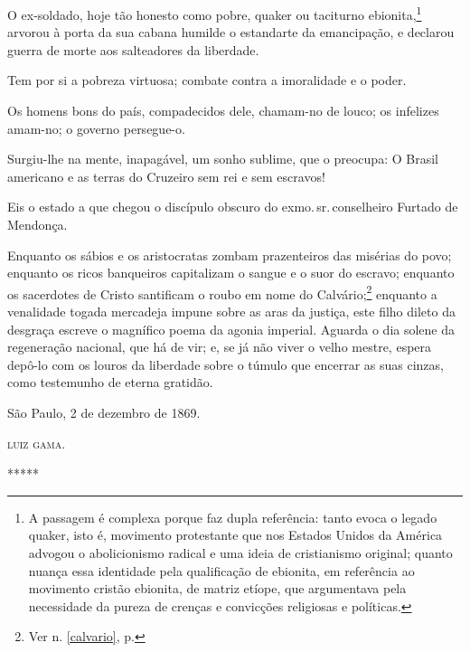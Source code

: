 O ex-soldado, hoje tão honesto como pobre, quaker ou taciturno
ebionita,\footnote{A passagem é complexa porque faz dupla referência:
  tanto evoca o legado quaker, isto é, movimento protestante que nos
  Estados Unidos da América advogou o abolicionismo radical e uma ideia
  de cristianismo original; quanto nuança essa identidade pela
  qualificação de ebionita, em referência ao movimento cristão ebionita,
  de matriz etíope, que argumentava pela necessidade da pureza de
  crenças e convicções religiosas e políticas.} arvorou à porta da sua
cabana humilde o estandarte da emancipação, e declarou guerra de morte
aos salteadores da liberdade.

Tem por si a pobreza virtuosa; combate contra a imoralidade e o poder.

Os homens bons do país, compadecidos dele, chamam-no de louco; os
infelizes amam-no; o governo persegue-o.

Surgiu-lhe na mente, inapagável, um sonho sublime, que o preocupa: O
Brasil americano e as terras do Cruzeiro sem rei e sem escravos!

Eis o estado a que chegou o discípulo obscuro do exmo.\,sr.\,conselheiro
Furtado de Mendonça.

Enquanto os sábios e os aristocratas zombam prazenteiros das misérias do
povo; enquanto os ricos banqueiros capitalizam o sangue e o suor do
escravo; enquanto os sacerdotes de Cristo santificam o roubo em nome do
Calvário;\footnote{Ver n. \ref{calvario}, p. \pageref{calvario}} enquanto 
a venalidade togada mercadeja impune sobre as aras da justiça, este filho 
dileto da desgraça escreve o magnífico poema da agonia imperial. Aguarda 
o dia solene da regeneração nacional, que há de vir; e, se já não viver o 
velho mestre, espera depô-lo com os louros da liberdade sobre o túmulo que 
encerrar as suas cinzas, como testemunho de eterna gratidão.
\begin{flushright}
São Paulo, 2 de dezembro de 1869.

\textsc{luiz gama}.
\end{flushright}
*****
